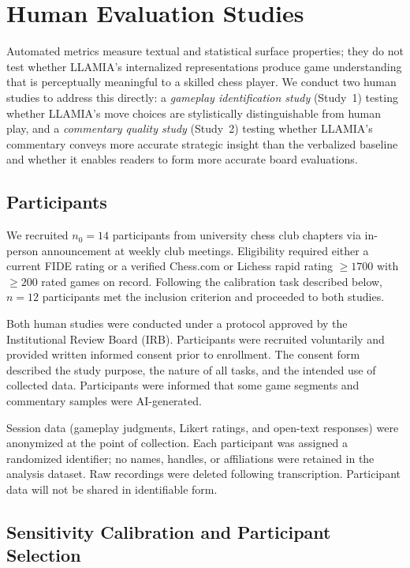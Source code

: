 \section{Human Evaluation Studies}
\label{sec:app_human}

Automated metrics measure textual and statistical surface properties; they do not test whether LLAMIA's internalized representations produce game understanding that is perceptually meaningful to a skilled chess player. We conduct two human studies to address this directly: a \emph{gameplay identification study} (Study~1) testing whether LLAMIA's move choices are stylistically distinguishable from human play, and a \emph{commentary quality study} (Study~2) testing whether LLAMIA's commentary conveys more accurate strategic insight than the verbalized baseline and whether it enables readers to form more accurate board evaluations.

\subsection{Participants}
\label{sec:app_human_participants}

We recruited $n_0 = 14$ participants from university chess club chapters via in-person announcement at weekly club meetings. Eligibility required either a current FIDE rating or a verified Chess.com or Lichess rapid rating $\geq 1700$ with $\geq 200$ rated games on record.  Following the calibration task described below, $n = 12$ participants met the inclusion criterion and proceeded to both studies.

Both human studies were conducted under a protocol approved by the Institutional Review Board (IRB).
Participants were recruited voluntarily and provided written informed consent prior to enrollment. The consent form described the study purpose, the nature of all tasks,  and the intended use of collected data. Participants were informed that some game segments and commentary samples were AI-generated.

Session data (gameplay judgments, Likert ratings, and open-text responses) were anonymized at the point of collection. Each participant was assigned a randomized identifier; no names, handles, or affiliations were retained in the analysis dataset. Raw recordings were deleted following transcription. Participant data will not be shared in identifiable form.

\subsection{Sensitivity Calibration and Participant Selection}
\label{sec:app_human_calibration}


